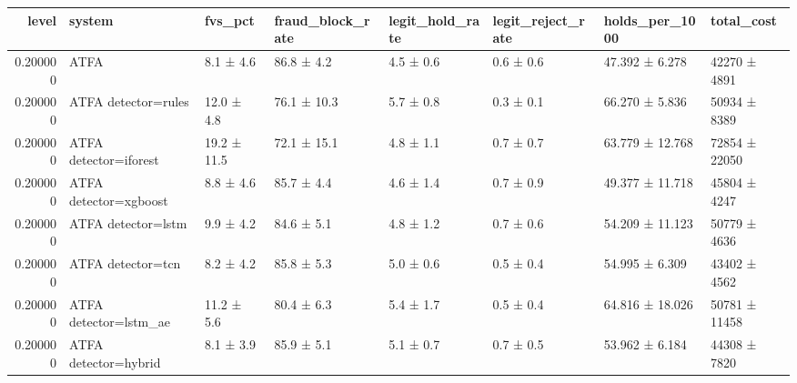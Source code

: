 \begin{tabular}{rlllllll}
\toprule
level & system & fvs\_pct & fraud\_block\_rate & legit\_hold\_rate & legit\_reject\_rate & holds\_per\_1000 & total\_cost \\
\midrule
0.200000 & ATFA & 8.1 ± 4.6 & 86.8 ± 4.2 & 4.5 ± 0.6 & 0.6 ± 0.6 & 47.392 ± 6.278 & 42270 ± 4891 \\
0.200000 & ATFA detector=rules & 12.0 ± 4.8 & 76.1 ± 10.3 & 5.7 ± 0.8 & 0.3 ± 0.1 & 66.270 ± 5.836 & 50934 ± 8389 \\
0.200000 & ATFA detector=iforest & 19.2 ± 11.5 & 72.1 ± 15.1 & 4.8 ± 1.1 & 0.7 ± 0.7 & 63.779 ± 12.768 & 72854 ± 22050 \\
0.200000 & ATFA detector=xgboost & 8.8 ± 4.6 & 85.7 ± 4.4 & 4.6 ± 1.4 & 0.7 ± 0.9 & 49.377 ± 11.718 & 45804 ± 4247 \\
0.200000 & ATFA detector=lstm & 9.9 ± 4.2 & 84.6 ± 5.1 & 4.8 ± 1.2 & 0.7 ± 0.6 & 54.209 ± 11.123 & 50779 ± 4636 \\
0.200000 & ATFA detector=tcn & 8.2 ± 4.2 & 85.8 ± 5.3 & 5.0 ± 0.6 & 0.5 ± 0.4 & 54.995 ± 6.309 & 43402 ± 4562 \\
0.200000 & ATFA detector=lstm\_ae & 11.2 ± 5.6 & 80.4 ± 6.3 & 5.4 ± 1.7 & 0.5 ± 0.4 & 64.816 ± 18.026 & 50781 ± 11458 \\
0.200000 & ATFA detector=hybrid & 8.1 ± 3.9 & 85.9 ± 5.1 & 5.1 ± 0.7 & 0.7 ± 0.5 & 53.962 ± 6.184 & 44308 ± 7820 \\
\bottomrule
\end{tabular}
